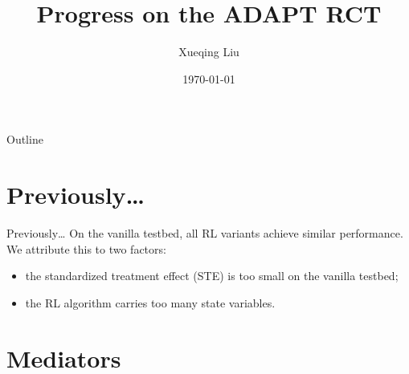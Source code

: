 \documentclass[10pt]{beamer}					%
\title{Progress on the ADAPT RCT}	%
\author{Xueqing Liu}								%
\date{\today}									%
\begin{document}
\maketitle

\begin{frame}{Outline}
    \tableofcontents
\end{frame}

\section{Previously\ldots}

\begin{frame}{Previously\ldots}
On the vanilla testbed, all RL variants achieve similar performance. We attribute this to two factors:
    \begin{itemize}
        \item the standardized treatment effect (STE) is too small on the vanilla testbed;
        \item the RL algorithm carries too many state variables.
    \end{itemize}
\end{frame}

\section{Mediators}
\end{document}
